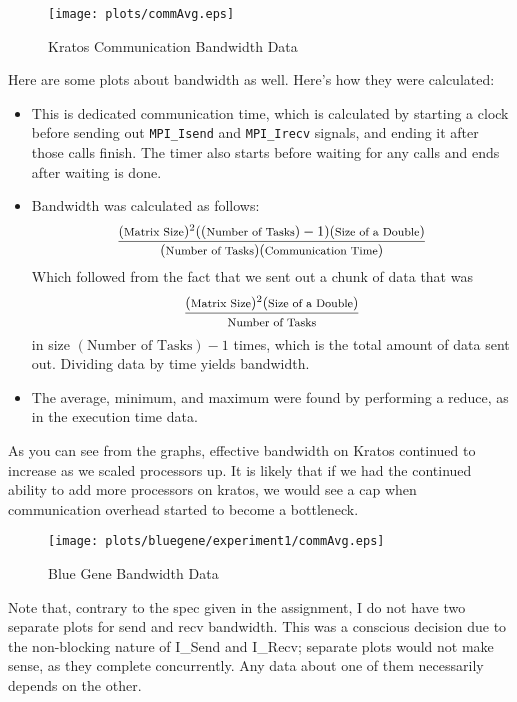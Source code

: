 \documentclass[twocolumn]{article}
\begin{document}
\begin{figure}
  \centering
  \texttt{[image: plots/commAvg.eps]}
  \caption{Kratos Communication Bandwidth Data}
\end{figure}

Here are some plots about bandwidth as well. Here's how they were calculated:
\begin{itemize}
\item This is dedicated communication time, which is calculated by starting a
  clock before sending out \texttt{MPI\_Isend} and \texttt{MPI\_Irecv} signals,
  and ending it after those calls finish. The timer also starts before waiting
  for any calls and ends after waiting is done. 
\item Bandwidth was calculated as follows:
  \[%
  \frac{(\mbox{\footnotesize{Matrix Size}})^2((\mbox{\footnotesize{Number of Tasks}})-1)(\mbox{\footnotesize{Size of a Double}})}{(\mbox{\footnotesize{Number of Tasks}})(\mbox{\footnotesize{Communication Time}})} \]
  Which followed from the fact that we sent out a chunk of data that was 
  \[ \frac{(\mbox{\footnotesize{Matrix Size}})^2(\mbox{\footnotesize{Size of a Double}})}{\mbox{\footnotesize{Number of Tasks}}} \]
  in size $(\mbox{Number of Tasks})-1$ times, which is the total amount of data
  sent out. Dividing data by time yields bandwidth.
\item The average, minimum, and maximum were found by performing a reduce, as in
  the execution time data. 
\end{itemize}

As you can see from the graphs, effective bandwidth on Kratos continued to increase 
as we scaled processors up. It is likely that if we had the continued ability to 
add more processors on kratos, we would see a cap when communication overhead 
started to become a bottleneck.\\

\begin{figure}
  \centering
  \texttt{[image: plots/bluegene/experiment1/commAvg.eps]}
  \caption{Blue Gene Bandwidth Data}
\end{figure}

Note that, contrary to the spec given in the assignment, I do not have two separate
plots for send and recv bandwidth. This was a conscious decision due to the 
non-blocking nature of I\_Send and I\_Recv; separate plots would not make sense, as
they complete concurrently. Any data about one of them necessarily depends on the 
other. \\
\end{document}
